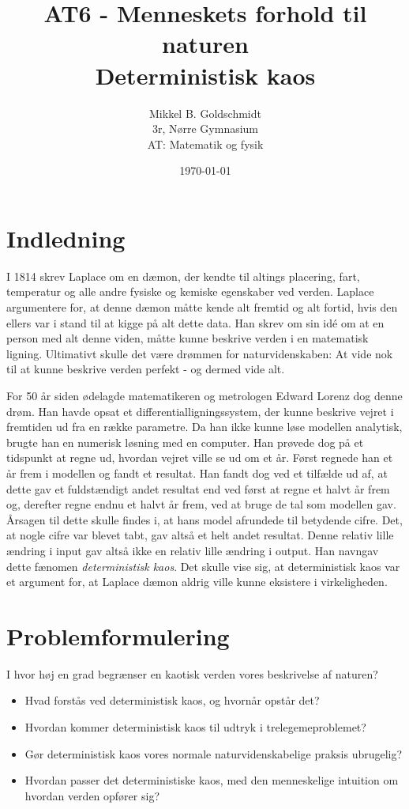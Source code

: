 \documentclass[12pt,a4paper]{article}
\author{Mikkel B. Goldschmidt\\ 3r, Nørre Gymnasium \\ AT: Matematik og fysik}
\title{AT6 - Menneskets forhold til naturen \\ Deterministisk kaos}
\date{\today}
\theoremstyle{break}
\theoremstyle{nonumberplain}
\begin{document}
\maketitle

\section{Indledning}
I 1814 skrev Laplace om en dæmon, der kendte til altings placering, fart, temperatur og alle andre fysiske og kemiske egenskaber ved verden.
Laplace argumentere for, at denne dæmon måtte kende alt fremtid og alt fortid, hvis den ellers var i stand til at kigge på alt dette data. 
Han skrev om sin idé om at en person med alt denne viden, måtte kunne beskrive verden i en matematisk ligning. 
Ultimativt skulle det være drømmen for naturvidenskaben: At vide nok til at kunne beskrive verden perfekt - og dermed vide alt.

For 50 år siden ødelagde matematikeren og metrologen Edward Lorenz dog denne drøm. 
Han havde opsat et differentialligningssystem, der kunne beskrive vejret i fremtiden ud fra en række parametre. 
Da han ikke kunne løse modellen analytisk, brugte han en numerisk løsning med en computer. 
Han prøvede dog på et tidspunkt at regne ud, hvordan vejret ville se ud om et år. 
Først regnede han et år frem i modellen og fandt et resultat. 
Han fandt dog ved et tilfælde ud af, at dette gav et fuldstændigt andet resultat end ved først at regne et halvt år frem og, derefter  regne endnu et halvt år frem, ved at bruge de tal som modellen gav. 
Årsagen til dette skulle findes i, at hans model afrundede til betydende cifre. 
Det, at nogle cifre var blevet tabt, gav altså et helt andet resultat. 
Denne relativ lille ændring i input gav altså ikke en relativ lille ændring i output. 
Han navngav dette fænomen \textit{deterministisk kaos}.
Det skulle vise sig, at deterministisk kaos var et argument for, at Laplace dæmon aldrig ville kunne eksistere i virkeligheden.

\section{Problemformulering}
I hvor høj en grad begrænser en kaotisk verden vores beskrivelse af naturen?

\begin{itemize}
\item Hvad forstås ved deterministisk kaos, og hvornår opstår det?
\item Hvordan kommer deterministisk kaos til udtryk i trelegemeproblemet?
\item Gør deterministisk kaos vores normale naturvidenskabelige praksis ubrugelig?
\item Hvordan passer det deterministiske kaos, med den menneskelige intuition om hvordan verden opfører sig?
\end{itemize}
\end{document}

